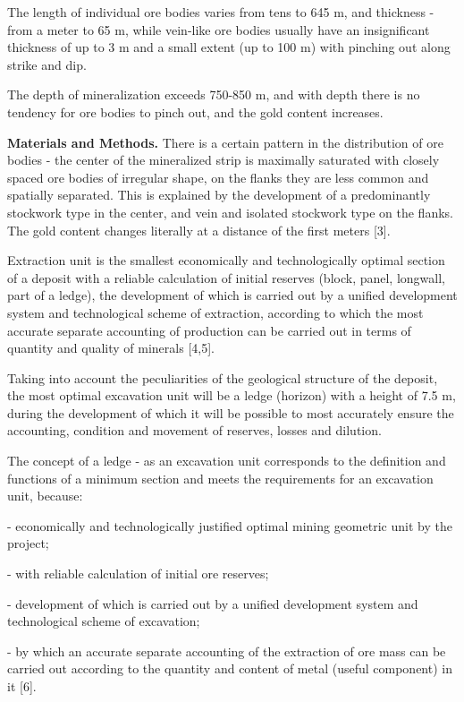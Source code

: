 \begin{multicols}{2}
The length of individual ore bodies varies from tens to 645 m, and
thickness - from a meter to 65 m, while vein-like ore bodies usually
have an insignificant thickness of up to 3 m and a small extent (up to
100 m) with pinching out along strike and dip.

The depth of mineralization exceeds 750-850 m, and with depth there is
no tendency for ore bodies to pinch out, and the gold content increases.

{\bfseries Materials and Methods.} There is a certain pattern in the
distribution of ore bodies - the center of the mineralized strip is
maximally saturated with closely spaced ore bodies of irregular shape,
on the flanks they are less common and spatially separated. This is
explained by the development of a predominantly stockwork type in the
center, and vein and isolated stockwork type on the flanks. The gold
content changes literally at a distance of the first meters {[}3{]}.

Extraction unit is the smallest economically and technologically optimal
section of a deposit with a reliable calculation of initial reserves
(block, panel, longwall, part of a ledge), the development of which is
carried out by a unified development system and technological scheme of
extraction, according to which the most accurate separate accounting of
production can be carried out in terms of quantity and quality of
minerals {[}4,5{]}.

Taking into account the peculiarities of the geological structure of the
deposit, the most optimal excavation unit will be a ledge (horizon) with
a height of 7.5 m, during the development of which it will be possible
to most accurately ensure the accounting, condition and movement of
reserves, losses and dilution.

The concept of a ledge - as an excavation unit corresponds to the
definition and functions of a minimum section and meets the requirements
for an excavation unit, because:

- economically and technologically justified optimal mining geometric
unit by the project;

- with reliable calculation of initial ore reserves;

- development of which is carried out by a unified development system
and technological scheme of excavation;

- by which an accurate separate accounting of the extraction of ore mass
can be carried out according to the quantity and content of metal
(useful component) in it {[}6{]}.


\end{multicols}

